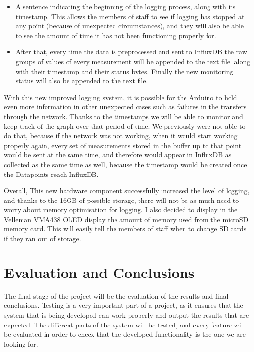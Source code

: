 \documentclass[12pt]{article}
\begin{document}
\begin{itemize}
    \item A sentence indicating the beginning of the logging process, along with its timestamp. This allows the members of staff to see if logging has stopped at any point (because of unexpected circumstances), and they will also be able to see the amount of time it has not been functioning properly for.
    \item After that, every time the data is preprocessed and sent to InfluxDB the raw groups of values of every measurement will be appended to the text file, along with their timestamp and their status bytes. Finally the new monitoring status will also be appended to the text file. 
\end{itemize}

With this new improved logging system, it is possible for the Arduino to hold even more information in other unexpected cases such as failures in the transfers through the network. Thanks to the timestamps we will be able to monitor and keep track of the graph over that period of time. We previously were not able to do that, because if the network was not working, when it would start working properly again, every set of measurements stored in the buffer up to that point would be sent at the same time, and therefore would appear in InfluxDB as collected as the same time as well, because the timestamp would be created once the Datapoints reach InfluxDB.\par 

Overall, This new hardware component successfully increased the level of logging, and thanks to the 16GB of possible storage, there will not be as much need to worry about memory optimisation for logging. I also decided to display in the Velleman VMA438 OLED display the amount of memory used from the microSD memory card. This will easily tell the members of staff when to change SD cards if they ran out of storage. 

\section{Evaluation and Conclusions}

The final stage of the project will be the evaluation of the results and final conclusions. Testing is a very important part of a project, as it ensures that the system that is being developed can work properly and output the results that are expected. The different parts of the system will be tested, and every feature will be evaluated in order to check that the developed functionality is the one we are looking for.
\end{document}
